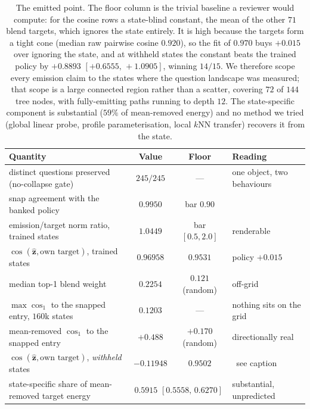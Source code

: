 \documentclass[11pt]{article}
\newcommand{\zz}{\mathbf{z}}
\newcommand{\zhat}{\hat{\zz}}
\newcommand{\cmark}{\ding{51}}
\newcommand{\xmark}{\ding{55}}
\begin{document}
\begin{table}[htbp]
\centering\footnotesize\setlength{\tabcolsep}{5pt}
\begin{tabular}{@{}lccl@{}}
\toprule
\textbf{Quantity} & \textbf{Value} & \textbf{Floor} & \textbf{Reading} \\
\midrule
distinct questions preserved (no-collapse gate) & $245/245$ & --- & one object, two behaviours \\
snap agreement with the banked policy & $0.9950$ & bar $0.90$ & \cmark \\
emission/target norm ratio, trained states & $1.0449$ & bar $[0.5,2.0]$ & renderable \\
\midrule
$\cos(\zhat,\text{own target})$, trained states & $0.96958$ & $0.9531$ & policy $+0.015$ \\
median top-1 blend weight & $0.2254$ & $0.121$ (random) & off-grid \\
$\max\cos_1$ to the snapped entry, $160$k states & $0.1203$ & --- & nothing sits on the grid \\
mean-removed $\cos_1$ to the snapped entry & $+0.488$ & $+0.170$ (random) & directionally real \\
\midrule
$\cos(\zhat,\text{own target})$, \emph{withheld} states & $-0.11948$ & $0.9502$ & \xmark\ see caption \\
state-specific share of mean-removed target energy & \multicolumn{2}{c}{$0.5915$ $[0.5558,\,0.6270]$}
& substantial, unpredicted \\
\bottomrule
\end{tabular}
\caption{The emitted point. The floor column is the trivial baseline a reviewer would compute: for
the cosine rows a state-blind constant, the mean of the other $71$ blend targets, which ignores the
state entirely. It is high because the targets form a tight cone (median raw pairwise cosine
$0.920$), so the fit of $0.970$ buys $+0.015$ over ignoring the state, and at withheld states the
constant beats the trained policy by $+0.8893$ $[+0.6555,\,+1.0905]$, winning $14/15$. We therefore
scope every emission claim to the states where the question landscape was measured; that scope is a
large connected region rather than a scatter, covering $72$ of $144$ tree nodes, with fully-emitting
paths running to depth $12$. The state-specific component is substantial ($59\%$ of mean-removed
energy) and no method we tried (global linear probe, profile parameterisation, local $k$NN transfer)
recovers it from the state.}
\label{tab:point}
\end{table}
\end{document}
